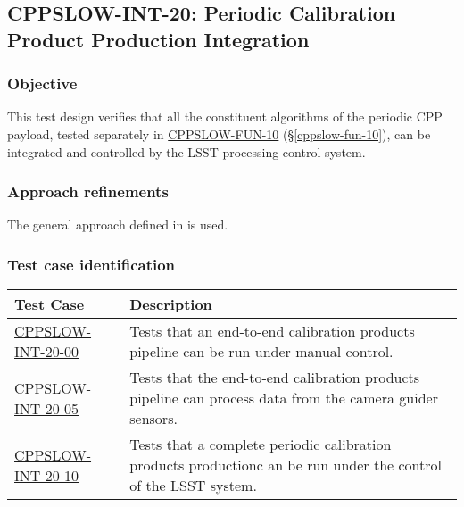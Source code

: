 \subsection{CPPSLOW-INT-20: Periodic Calibration Product Production Integration}
\label{cppslow-int-20}

\subsubsection{Objective}

This test design verifies that all the constituent algorithms of the periodic
CPP payload, tested separately in \hyperref[cppslow-fun-10]{CPPSLOW-FUN-10}
(\S\ref{cppslow-fun-10}), can be integrated and controlled by the LSST
processing control system.

\subsubsection{Approach refinements}

The general approach defined in  is used.

\subsubsection{Test case identification}

\begin{longtable} {|p{}|p{}|}\hline
\textbf{Test Case}  & \textbf{Description} \\\hline

\hyperref[cppslow-int-20-00]{CPPSLOW-INT-20-00} & Tests that an end-to-end calibration products pipeline can be run under manual control.\\\hline
\hyperref[cppslow-int-20-05]{CPPSLOW-INT-20-05} & Tests that the end-to-end calibration products pipeline can process data from the camera guider sensors.\\\hline
\hyperref[cppslow-int-20-10]{CPPSLOW-INT-20-10} & Tests that a complete periodic calibration products productionc an be run under the control of the LSST system.\\\hline
\end{longtable}
